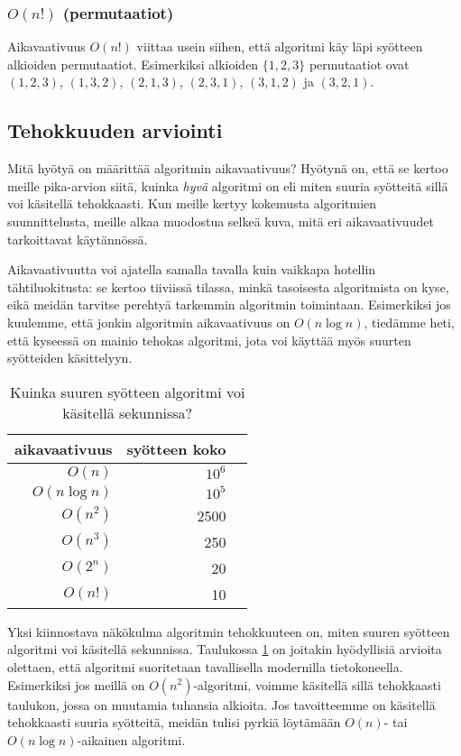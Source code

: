 \subsubsection{$O(n!)$ (permutaatiot)}

Aikavaativuus $O(n!)$ viittaa usein siihen,
että algoritmi käy läpi syötteen alkioiden permutaatiot.
Esimerkiksi alkioiden $\{1,2,3\}$ permutaatiot ovat
$(1,2,3)$, $(1,3,2)$, $(2,1,3)$, $(2,3,1)$, $(3,1,2)$ ja $(3,2,1)$.

\subsection{Tehokkuuden arviointi}

Mitä hyötyä on määrittää algoritmin aikavaativuus?
Hyötynä on, että se kertoo meille pika-arvion siitä,
kuinka \emph{hyvä} algoritmi on eli miten suuria syötteitä
sillä voi käsitellä tehokkaasti.
Kun meille kertyy kokemusta algoritmien suunnittelusta,
meille alkaa muodostua selkeä kuva,
mitä eri aikavaativuudet tarkoittavat käytännössä.

Aikavaativuutta voi ajatella samalla tavalla kuin vaikkapa
hotellin tähti\-luokitusta: se kertoo tiiviissä tilassa,
minkä tasoisesta algoritmista on kyse,
eikä meidän tarvitse perehtyä tarkemmin
algoritmin toimintaan.
Esimerkiksi jos kuulemme, että jonkin algoritmin aikavaativuus on $O(n \log n)$,
tiedämme heti, että kyseessä on mainio tehokas algoritmi,
jota voi käyttää myös suurten syötteiden käsittelyyn.

\begin{table}
\center
\begin{tabular}{rrr}
aikavaativuus & syötteen koko \\
\hline
$O(n)$ & $10^6$ & \\
$O(n \log n)$ & $10^5$ & \\
$O(n^2)$ & 2500 & \\
$O(n^3)$ & 250 & \\
$O(2^n)$ & 20 & \\
$O(n!)$ & 10 & \\
\end{tabular}
\caption{Kuinka suuren syötteen algoritmi voi käsitellä sekunnissa?}
\label{tab:algteh}
\end{table}

Yksi kiinnostava näkökulma algoritmin tehokkuuteen on,
miten suuren syötteen algoritmi voi käsitellä sekunnissa.
Taulukossa \ref{tab:algteh} on joitakin hyödyl\-lisiä arvioita
olettaen, että algoritmi suoritetaan tavallisella modernilla tietokoneella.
Esimerkiksi jos meillä on $O(n^2)$-algoritmi, voimme käsitellä sillä
tehokkaasti taulukon, jossa on muutamia tuhansia alkioita.
Jos tavoitteemme on käsitellä tehokkaasti suuria syötteitä,
meidän tulisi pyrkiä löytämään $O(n)$- tai $O(n \log n)$-aikainen
algoritmi.

